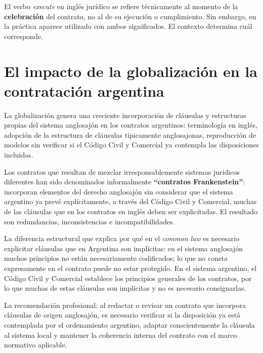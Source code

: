 \documentclass[12pt,oneside]{book}
\begin{document}
\begin{important}
El verbo \textit{execute} en inglés jurídico se refiere técnicamente al momento de la \textbf{celebración} del contrato, no al de su ejecución o cumplimiento. Sin embargo, en la práctica aparece utilizado con ambos significados. El contexto determina cuál corresponde.
\end{important}

\section{El impacto de la globalización en la contratación argentina}

La globalización genera una creciente incorporación de cláusulas y estructuras propias del sistema anglosajón en los contratos argentinos: terminología en inglés, adopción de la estructura de cláusulas típicamente anglosajonas, reproducción de modelos sin verificar si el Código Civil y Comercial ya contempla las disposiciones incluidas.

\begin{important}
Los contratos que resultan de mezclar irresponsablemente sistemas jurídicos diferentes han sido denominados informalmente \textbf{``contratos Frankenstein''}: incorporan elementos del derecho anglosajón sin considerar que el sistema argentino ya prevé explícitamente, a través del Código Civil y Comercial, muchas de las cláusulas que en los contratos en inglés deben ser explicitadas. El resultado son redundancias, inconsistencias e incompatibilidades.
\end{important}

La diferencia estructural que explica por qué en el \textit{common law} es necesario explicitar cláusulas que en Argentina son implícitas: en el sistema anglosajón muchos principios no están necesariamente codificados; lo que no consta expresamente en el contrato puede no estar protegido. En el sistema argentino, el Código Civil y Comercial establece los principios generales de los contratos, por lo que muchas de estas cláusulas son implícitas y no es necesario consignarlas.

La recomendación profesional: al redactar o revisar un contrato que incorpora cláusulas de origen anglosajón, es necesario verificar si la disposición ya está contemplada por el ordenamiento argentino, adaptar conscientemente la cláusula al sistema local y mantener la coherencia interna del contrato con el marco normativo aplicable.

\end{document}

